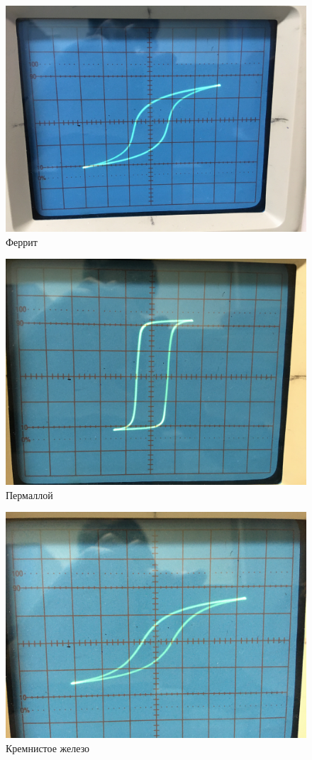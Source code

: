 \documentclass[a4paper]{article}
\begin{document}
\begin{figure}[tbp]
	\centering	
	\begin{minipage}{0.33\linewidth}
		\centering
		\includegraphics[width=0.9\linewidth]{Результаты/Феррит/IMG_2877}
		Феррит
	\end{minipage}
	\begin{minipage}{0.33\linewidth}
		\centering
		\includegraphics[width=0.9\linewidth]{Результаты/Пермаллой/IMG_2889}
		Пермаллой
	\end{minipage}

	\begin{minipage}{0.33\linewidth}
		\centering
		\includegraphics[width=0.9\linewidth]{Результаты/Кремнистое железо/IMG_2903}
		Кремнистое железо
	\end{minipage}


\end{figure}
\end{document}
